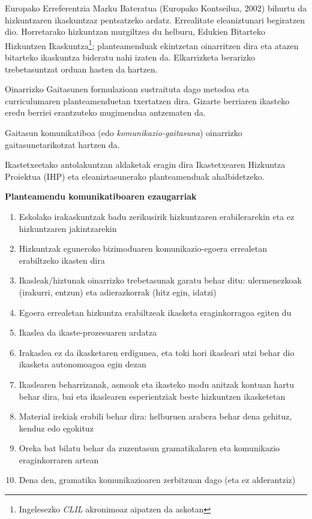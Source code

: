 \documentclass[]{book}
\providecommand{\tightlist}{%
  \setlength{\itemsep}{0pt}\setlength{\parskip}{0pt}}
\let\rmarkdownfootnote\footnote%
\def\footnote{\protect\rmarkdownfootnote}
\begin{document}
Europako Erreferentzia Marku Bateratua (Europako Kontseilua, 2002) bihurtu da hizkuntzaren ikaskuntzaz pentsatzeko ardatz. Errealitate eleaniztunari begiratzen dio. Horretarako hizkuntzan murgiltzea du helburu, Edukien Bitarteko Hizkuntzen Ikaskuntza\footnote{Ingelesezko \emph{CLIL} akronimoaz aipatzen da askotan}; planteamenduak ekintzetan oinarritzen dira eta atazen bitarteko ikaskuntza bideratu nahi izaten da. Elkarrizketa berarizko trebetasuntzat orduan hasten da hartzen.

Oinarrizko Gaitasunen formulazioan sustraituta dago metodoa eta curriculumaren planteamenduetan txertatzen dira. Gizarte berriaren ikasteko eredu berriei erantzuteko mugimendua antzematen da.

Gaitasun komunikatiboa (edo \emph{komunikazio-gaitasuna}) oinarrizko gaitasunetarikotzat hartzen da.

Ikastetxeetako antolakuntzan aldaketak eragin dira Ikastetxearen Hizkuntza Proiektua (IHP) eta eleaniztasunerako planteamenduak ahalbidetzeko.

\textbf{Planteamendu komunikatiboaren ezaugarriak}

\begin{enumerate}
\def\labelenumi{\arabic{enumi}.}
\tightlist
\item
  Eskolako irakaskuntzak badu zerikusirik hizkuntzaren erabilerarekin eta ez hizkuntzaren jakintzarekin
\item
  Hizkuntzak eguneroko bizimoduaren komunikazio-egoera errealetan erabiltzeko ikasten dira
\item
  Ikasleak/hiztunak oinarrizko trebetasunak garatu behar ditu: ulermenezkoak (irakurri, entzun) eta adierazkorrak (hitz egin, idatzi)
\item
  Egoera errealetan hizkuntza erabiltzeak ikasketa eraginkorragoa egiten du
\item
  Ikaslea da ikaste-prozesuaren ardatza
\item
  Irakaslea ez da ikasketaren erdigunea, eta toki hori ikasleari utzi behar dio ikasketa autonomoagoa egin dezan
\item
  Ikaslearen beharrizanak, asmoak eta ikasteko modu anitzak kontuan hartu behar dira, bai eta ikaslearen esperientziak beste hizkuntzen ikasketetan
\item
  Material irekiak erabili behar dira: helburuen arabera behar dena gehituz, kenduz edo egokituz
\item
  Oreka bat bilatu behar da zuzentasun gramatikalaren eta komunikazio eraginkorraren artean
\item
  Dena den, gramatika komunikazioaren zerbitzuan dago (eta ez alderantziz)
\end{enumerate}
\end{document}
